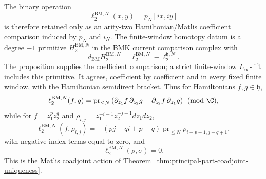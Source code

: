 \documentclass[11pt]{memoir}
\begin{document}
\begin{prop}
  The binary operation
  \[
    \ell_2^{\mathrm{BM},N}(x,y)=p_N[i x,i y]
  \]
  is therefore retained only as an arity-two Hamiltonian/Matlis
  coefficient comparison induced by \(p_N\) and \(i_N\).  The
  finite-window homotopy datum is a degree \(-1\) primitive
  \(H^{\mathrm{BM},N}_2\) in the BMK current comparison complex with
  \[
    d_{\mathrm{BM}}H^{\mathrm{BM},N}_2
    =
    \ell_2^{\mathrm{BM},N}
    -
    \ell_2^{\mathfrak h,N}.
  \]
  The proposition supplies the coefficient comparison; a strict
  finite-window \(L_\infty\)-lift includes this primitive.  It agrees,
  coefficient by coefficient and in every fixed finite window, with the
  Hamiltonian semidirect bracket.  Thus for Hamiltonians
  \(f,g\in\mathfrak h\),
  \[
    \ell_2^{\mathrm{BM},N}(f,g)
      =
      \operatorname{pr}_{\le N}
      \left(
      \partial_{z_1}f\,\partial_{z_2}g
      -
      \partial_{z_2}f\,\partial_{z_1}g
      \right)
      \pmod{\C},
  \]
  while for \(f=z_1^pz_2^q\) and
  \(\rho_{i,j}=z_1^{-i-1}z_2^{-j-1}dz_1dz_2\),
  \[
    \ell_2^{\mathrm{BM},N}(f,\rho_{i,j})
      =
      -(pj-qi+p-q)\operatorname{pr}_{\le N}
      \rho_{i-p+1,j-q+1},
  \]
  with negative-index terms equal to zero, and
  \[
    \ell_2^{\mathrm{BM},N}(\rho,\sigma)=0 .
  \]
  This is the Matlis coadjoint action of
  Theorem~\ref{thm:principal-part-coadjoint-uniqueness}.


\end{prop}
\end{document}
